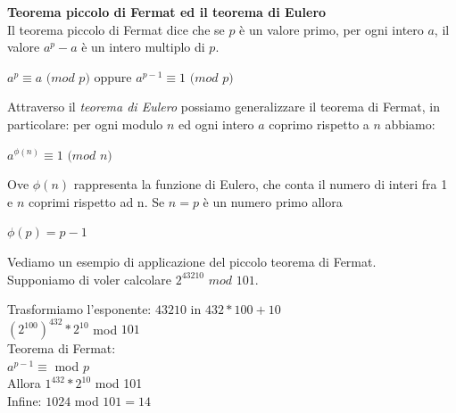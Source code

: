 \documentclass[11pt, oneside]{article}   	%
\begin{document}
\textbf{Teorema piccolo di Fermat ed il teorema di Eulero}\\
Il teorema piccolo di Fermat dice che se $p$ è un valore primo, per ogni intero $a$, il valore $a^p-a$ è un intero multiplo di $p$.
\begin{center}
$a^p \equiv a$ $(mod$ $p )$  oppure  $a^{p-1}\equiv 1$ $(mod$ $p )$
\end{center}
Attraverso il \emph{teorema di Eulero} possiamo generalizzare il teorema di Fermat, in particolare: per ogni modulo $n$ ed ogni intero $a$ coprimo rispetto a $n$ abbiamo:
\begin{center}
$a^{\phi(n)} \equiv 1$ $(mod$ $n)$
\end{center}
Ove $\phi(n)$ rappresenta la funzione di Eulero, che conta il numero di interi fra 1 e $n$ coprimi rispetto ad n. Se $n = p$ è un numero primo allora 
\begin{center}
$\phi(p) = p-1$
\end{center}
Vediamo un esempio di applicazione del piccolo teorema di Fermat.\\
Supponiamo di voler calcolare $2^{43210}$ $mod$ $101$.
\begin{center}
Trasformiamo l'esponente: $43210$ in  $432*100 + 10$\\
$(2^{100})^{432}  * 2^{10}$ mod $101$\\ 
Teorema di Fermat: \\$a^{p-1}\equiv$ mod $p$\\
Allora $1^{432} * 2^{10} $ mod 101\\
Infine: $1024$ mod $101 = 14$
\end{center}
\end{document}
